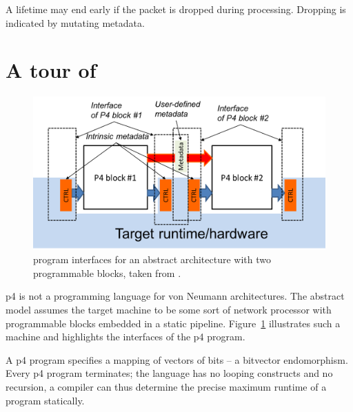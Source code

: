 A lifetime may end early if the packet is dropped during processing. Dropping is
indicated by mutating metadata.

\section{A tour of \pfs}

\begin{figure}[t]
	\includegraphics[width=1.00\textwidth]{resources/p4_16-architecture-model.png}

	\caption{\pfs program interfaces for an abstract architecture with two
	programmable blocks, taken from \cite{p416:v123:spec}.}
	\label{fig:arch-model}
\end{figure}

\acrshort{p4} is not a programming language for von Neumann
architectures. The abstract
model assumes the target machine to be some sort of network processor with
programmable blocks embedded in a static pipeline. Figure~\ref{fig:arch-model}
illustrates such a machine and highlights the interfaces of the \acrshort{p4}
program.

A \acrshort{p4} program specifies a mapping of vectors of bits -- a bit\-vector
endomorphism. Every \acrshort{p4} program terminates; the language has no
looping constructs and no recursion, a compiler can thus determine the precise
maximum runtime of a program statically.


